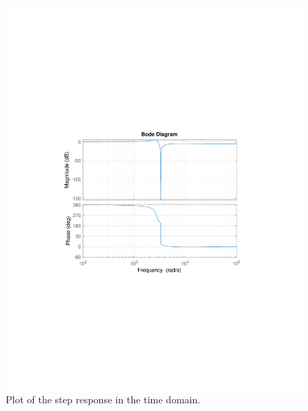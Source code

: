 \documentclass{homework}
\begin{document}
	\begin{figure}[H]
		\centering
		\includegraphics[width=0.7\linewidth,clip,trim=4cm 8.5cm 3cm 8.5cm]{part2_3bode}
		\caption{Plot of the step response in the time domain.}
		\label{fig:part23bode}
	\end{figure}

	\pagebreak
\end{document}
